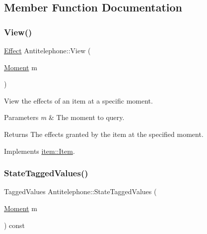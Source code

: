 \subsection{Member Function Documentation}
\mbox{\label{classitem_1_1_antitelephone_aa44819e9242edbdfdfc4f14b5d2b34ec}} 
\subsubsection{\texorpdfstring{View()}{View()}}
{\footnotesize\ttfamily \hyperlink{classitem_1_1_effect}{Effect} Antitelephone\+::\+View (\begin{DoxyParamCaption}\item[{\hyperlink{classtimeplane_1_1_moment}{Moment}}]{m }\end{DoxyParamCaption})\hspace{0.3cm}{\ttfamily [virtual]}}



View the effects of an item at a specific moment. 


\begin{DoxyParams}{Parameters}
{\em m} & The moment to query. \\
\hline
\end{DoxyParams}
\begin{DoxyReturn}{Returns}
The effects granted by the item at the specified moment. 
\end{DoxyReturn}


Implements \hyperlink{classitem_1_1_item_a400dfeabc4056d36bfd348ff9c51cf7d}{item\+::\+Item}.

\mbox{\label{classitem_1_1_antitelephone_afe8ac703b5f19181f221afe07c05cae7}} 
\subsubsection{\texorpdfstring{State\+Tagged\+Values()}{StateTaggedValues()}}
{\footnotesize\ttfamily Tagged\+Values Antitelephone\+::\+State\+Tagged\+Values (\begin{DoxyParamCaption}\item[{\hyperlink{classtimeplane_1_1_moment}{Moment}}]{m }\end{DoxyParamCaption}) const\hspace{0.3cm}{\ttfamily [virtual]}}



